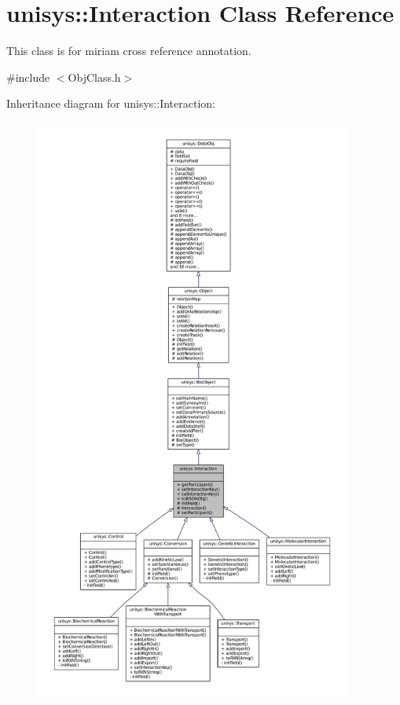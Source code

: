 \hypertarget{classunisys_1_1Interaction}{\section{unisys\-:\-:Interaction Class Reference}
\label{classunisys_1_1Interaction}
}


This class is for miriam cross reference annotation.  




{\ttfamily \#include $<$Obj\-Class.\-h$>$}



Inheritance diagram for unisys\-:\-:Interaction\-:
\nopagebreak
\begin{figure}[H]
\begin{center}
\leavevmode
\includegraphics[height=550pt]{classunisys_1_1Interaction__inherit__graph}
\end{center}
\end{figure}


